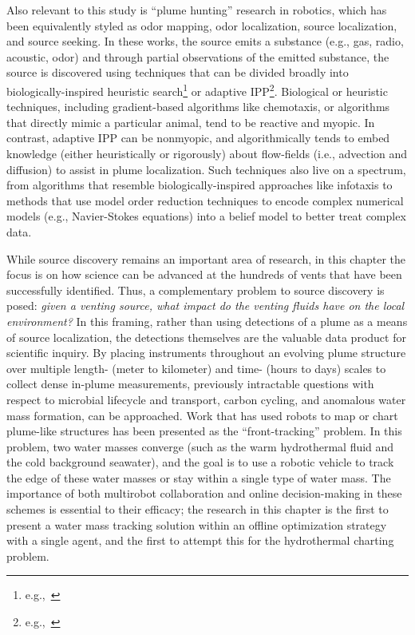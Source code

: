 Also relevant to this study is ``plume hunting'' research in robotics, which has been equivalently styled as odor mapping, odor localization, source localization, and source seeking. In these works, the source emits a substance (e.g., gas, radio, acoustic, odor) and through partial observations of the emitted substance, the source is discovered using techniques that can be divided broadly into biologically-inspired heuristic search\footnote{e.g.,~\cite{reddy2022olfactory,chen2019odor}} or adaptive IPP\footnote{e.g.,~\cite{salam2019adaptive}}. Biological or heuristic techniques, including gradient-based algorithms like chemotaxis\autocite{morse1998robust}, or algorithms that directly mimic a particular animal\autocite{edwards2001representing}, tend to be reactive and myopic. In contrast, adaptive IPP can be nonmyopic, and algorithmically tends to embed knowledge (either heuristically or rigorously) about flow-fields (i.e., advection and diffusion) to assist in plume localization. Such techniques also live on a spectrum, from algorithms that resemble biologically-inspired approaches like infotaxis\autocite{vergassola2007infotaxis} to methods that use model order reduction techniques to encode complex numerical models (e.g., Navier-Stokes equations) into a belief model to better treat complex data\autocite{peng2014dynamic}.

While source discovery remains an important area of research, in this chapter the focus is on how science can be advanced at the hundreds of vents that have been successfully identified. Thus, a complementary problem to source discovery is posed: \emph{given a venting source, what impact do the venting fluids have on the local environment?} In this framing, rather than using detections of a plume as a means of source localization, the detections themselves are the valuable data product for scientific inquiry. By placing instruments throughout an evolving plume structure over multiple length- (meter to kilometer) and time- (hours to days) scales to collect dense in-plume measurements, previously intractable questions with respect to microbial lifecycle and transport, carbon cycling, and anomalous water mass formation, can be approached. Work that has used robots to map or chart plume-like structures has been presented as the ``front-tracking'' problem\autocite{li2014multi,chen2019odor}. In this problem, two water masses converge (such as the warm hydrothermal fluid and the cold background seawater), and the goal is to use a robotic vehicle to track the edge of these water masses or stay within a single type of water mass. The importance of both multirobot collaboration and online decision-making in these schemes is essential to their efficacy; the research in this chapter is the first to present a water mass tracking solution within an offline optimization strategy with a single agent, and the first to attempt this for the hydrothermal charting problem.



